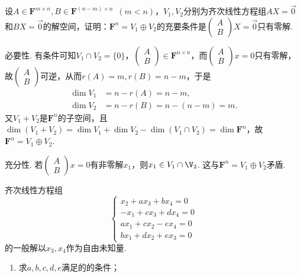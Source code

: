 \begin{exercise}
\begin{exgroup}
        \item 设$A \in \mathbf{F}^{m \times n},B \in \mathbf{F}^{(n-m) \times n}\enspace(m<n)$，$V_1,V_2$分别为齐次线性方程组$AX=\vec{0}$和$BX=\vec{0}$的解空间，证明：$\mathbf{F}^n=V_1\oplus V_2$的充要条件是$\begin{pmatrix} A \\ B \end{pmatrix}X=\vec{0}$只有零解.
        \begin{answer}
            必要性. 有条件可知$V_1\cap V_2=\{0\}$，$\begin{pmatrix}A\\B\end{pmatrix}\in\mathbf{F}^{n\times n}$，而$\begin{pmatrix}A\\B\end{pmatrix}x=0$只有零解，故$\begin{pmatrix}A\\B\end{pmatrix}$可逆，从而$r(A)=m,r(B)=n-m$，于是
          \begin{align*}
              \dim V_1 & =n-r(A)=n-m,       \\
              \dim V_2 & =n-r(B)=n-(n-m)=m.
          \end{align*}
          又$V_1+V_2$是$\mathbf{F}^n$的子空间，且$\dim(V_1+V_2)=\dim V_1+\dim V_2-\dim(V_1\cap V_2)=\dim\mathbf{F}^n$，故$\mathbf{F}^n=V_1\oplus V_2$.

          充分性. 若$\begin{pmatrix}A\\B\end{pmatrix}x=0$有非零解$x_1$，则$x_1\in V_1\cap\V_2$. 这与$\mathbf{F}^n=V_1\oplus V_2$矛盾.
        \end{answer}

        \item 齐次线性方程组\[\begin{cases}
                x_2+ax_3+bx_4=0  \\
                -x_1+cx_3+dx_4=0 \\
                ax_1+cx_2-ex_4=0 \\
                bx_1+dx_2+ex_3=0
            \end{cases}\]的一般解以$x_3,x_4$作为自由未知量.
        \begin{enumerate}
            \item 求$a,b,c,d,e$满足的的条件；


\end{enumerate}
\end{exgroup}
\end{exercise}

